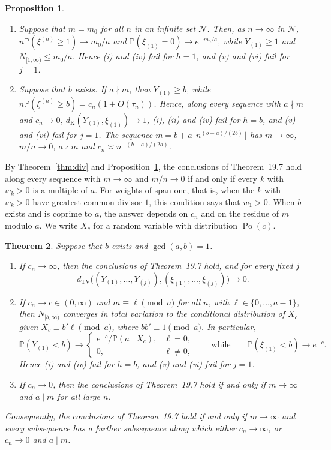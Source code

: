 \documentclass[11pt]{amsart}
\newtheorem{theorem}{Theorem}[section]
\newtheorem{proposition}[theorem]{Proposition}
\theoremstyle{definition}
\theoremstyle{remark}
\numberwithin{equation}{section}
\newcommand{\Pp}{\mathbb P}
\newcommand{\cN}{\mathcal N}
\newcommand{\dtv}{d_{\mathrm{TV}}}
\newcommand{\dK}{d_{\mathrm K}}
\DeclareMathOperator{\Po}{Po}
\begin{document}
\begin{proposition}\label{prop:fail}\leavevmode
\begin{enumerate}[label=(\alph*)]
\item Suppose that $m=m_0$ for all $n$ in an infinite set $\cN$. Then, as $n\to\infty$ in $\cN$, $n\Pp(\xi^{(n)}\ge1)\to m_0/a$ and $\Pp(\xi_{(1)}=0)\to e^{-m_0/a}$, while $Y_{(1)}\ge1$ and $N_{[1,\infty)}\le m_0/a$. Hence (i) and (iv) fail for $h=1$, and (v) and (vi) fail for $j=1$.
\item Suppose that $b$ exists. If $a\nmid m$, then $Y_{(1)}\ge b$, while $n\Pp(\xi^{(n)}\ge b)=c_n(1+O(\tau_n))$. Hence, along every sequence with $a\nmid m$ and $c_n\to0$, $\dK(Y_{(1)},\xi_{(1)})\to1$, (i), (ii) and (iv) fail for $h=b$, and (v) and (vi) fail for $j=1$. The sequence $m=b+a\lfloor n^{(b-a)/(2b)}\rfloor$ has $m\to\infty$, $m/n\to0$, $a\nmid m$ and $c_n\asymp n^{-(b-a)/(2a)}$.
\end{enumerate}
\end{proposition}

By Theorem~\ref{thm:div} and Proposition~\ref{prop:fail}, the conclusions of Theorem~19.7 hold along every sequence with $m\to\infty$ and $m/n\to0$ if and only if every $k$ with $w_k>0$ is a multiple of $a$. For weights of span one, that is, when the $k$ with $w_k>0$ have greatest common divisor $1$, this condition says that $w_1>0$. When $b$ exists and is coprime to $a$, the answer depends on $c_n$ and on the residue of $m$ modulo $a$. We write $X_c$ for a random variable with distribution $\Po(c)$.

\begin{theorem}\label{thm:coprime}
Suppose that $b$ exists and $\gcd(a,b)=1$.
\begin{enumerate}[label=(\alph*)]
\item If $c_n\to\infty$, then the conclusions of Theorem~19.7 hold, and for every fixed $j$
\[
\dtv\bigl((Y_{(1)},\dots,Y_{(j)}),(\xi_{(1)},\dots,\xi_{(j)})\bigr)\to0.
\]
\item If $c_n\to c\in(0,\infty)$ and $m\equiv\ell\pmod a$ for all $n$, with $\ell\in\{0,\dots,a-1\}$, then $N_{[b,\infty)}$ converges in total variation to the conditional distribution of $X_c$ given $X_c\equiv b'\ell\pmod a$, where $bb'\equiv1\pmod a$. In particular,
\[
\Pp(Y_{(1)}<b)\to\begin{cases}e^{-c}/\Pp(a\mid X_c),&\ell=0,\\0,&\ell\ne0,\end{cases}
\qquad\text{while}\qquad\Pp(\xi_{(1)}<b)\to e^{-c}.
\]
Hence (i) and (iv) fail for $h=b$, and (v) and (vi) fail for $j=1$.
\item If $c_n\to0$, then the conclusions of Theorem~19.7 hold if and only if $m\to\infty$ and $a\mid m$ for all large $n$.
\end{enumerate}
Consequently, the conclusions of Theorem~19.7 hold if and only if $m\to\infty$ and every subsequence has a further subsequence along which either $c_n\to\infty$, or $c_n\to0$ and $a\mid m$.
\end{theorem}
\end{document}
